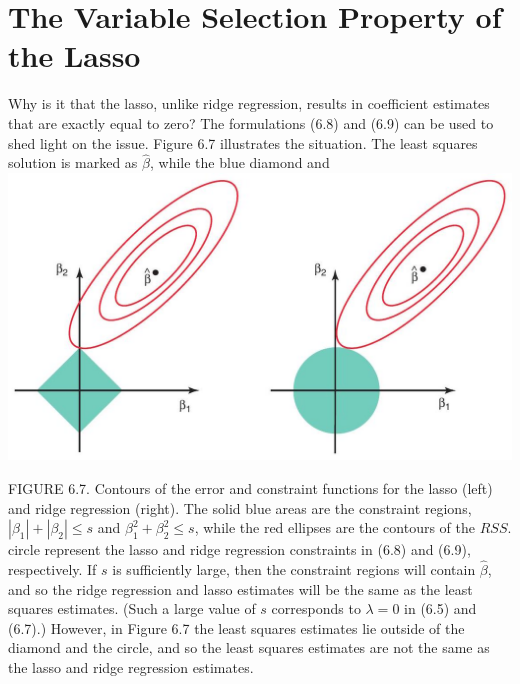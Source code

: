 \documentclass[10pt]{article}
\begin{document}
\section*{The Variable Selection Property of the Lasso}
Why is it that the lasso, unlike ridge regression, results in coefficient estimates that are exactly equal to zero? The formulations (6.8) and (6.9) can be used to shed light on the issue. Figure 6.7 illustrates the situation. The least squares solution is marked as $\hat{\beta}$, while the blue diamond and\\
\includegraphics[max width=\textwidth, center]{2025_05_05_efe77898333945044de4g-237}

FIGURE 6.7. Contours of the error and constraint functions for the lasso (left) and ridge regression (right). The solid blue areas are the constraint regions, $\left|\beta_{1}\right|+\left|\beta_{2}\right| \leq s$ and $\beta_{1}^{2}+\beta_{2}^{2} \leq s$, while the red ellipses are the contours of the $R S S$.\\
circle represent the lasso and ridge regression constraints in (6.8) and (6.9), respectively. If $s$ is sufficiently large, then the constraint regions will contain $\hat{\beta}$, and so the ridge regression and lasso estimates will be the same as the least squares estimates. (Such a large value of $s$ corresponds to $\lambda=0$ in (6.5) and (6.7).) However, in Figure 6.7 the least squares estimates lie outside of the diamond and the circle, and so the least squares estimates are not the same as the lasso and ridge regression estimates.
\end{document}
